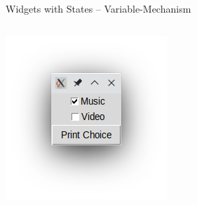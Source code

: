 \begin{frame}[fragile]{Widgets with States -- Variable-Mechanism}
\begin{columns}[T]
\includegraphics[width=\linewidth]{./gfx/12-tk-checkboxes}


\end{columns}
\end{frame}
